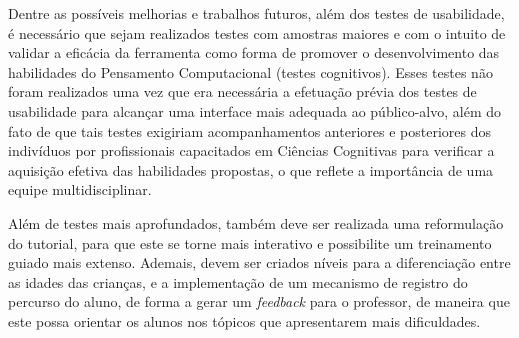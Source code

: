 Dentre as possíveis melhorias e trabalhos futuros, além dos testes de usabilidade, é necessário que sejam realizados testes com amostras maiores e com o intuito de validar a eficácia da ferramenta como forma de promover o desenvolvimento das habilidades do Pensamento Computacional (testes cognitivos). Esses testes não foram realizados uma vez que era necessária a efetuação prévia dos testes de usabilidade para alcançar uma interface mais adequada ao público-alvo, além do fato de que tais testes exigiriam acompanhamentos anteriores e posteriores dos indivíduos por profissionais capacitados em Ciências Cognitivas para verificar a aquisição efetiva das habilidades propostas, o que reflete a importância de uma equipe multidisciplinar. 

Além de testes mais aprofundados, também deve ser realizada uma reformulação do tutorial, para que este se torne mais interativo e possibilite um treinamento guiado mais extenso. Ademais, devem ser criados níveis para a diferenciação entre as idades das crianças, e a implementação de um mecanismo de registro do percurso do aluno, de forma a gerar um \textit{feedback} para o professor, de maneira que este possa orientar os alunos nos tópicos que apresentarem mais dificuldades.
